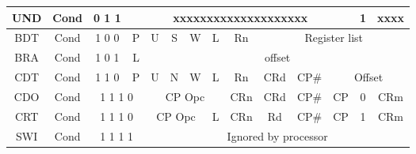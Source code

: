 {{\begin{tabular}{|c|c|c|c|c|c|c|c|c|c|c|c|c|c|c|c|c|c|c|c|c|c|c|c|c|c|c|c|c|c|c|c|c|}
\multicolumn{4}{|c|}{ \textsf{\scriptsize UND}}&
\textsf{\scriptsize Cond}&
\multicolumn{3}{c|}{\textsf{\scriptsize 0 1 1}}&
\multicolumn{20}{c|}{ \textsf{\scriptsize xxxxxxxxxxxxxxxxxxxx}}&
\textsf{\scriptsize 1}&
\multicolumn{4}{c|}{\textsf{\scriptsize xxxx }}\\
\hline 
\multicolumn{4}{|c|}{ \textsf{\scriptsize BDT}}&
\textsf{\scriptsize Cond}&
\multicolumn{3}{c|}{\textsf{\scriptsize 1 0 0}}&
\textsf{\scriptsize P}&
\textsf{\scriptsize U}&
\textsf{\scriptsize S}&
\textsf{\scriptsize W}&
\textsf{\scriptsize L}&
\multicolumn{4}{c|}{\textsf{\scriptsize Rn }}&
\multicolumn{16}{c|}{\textsf{\scriptsize Register list}}\\
\hline 
\multicolumn{4}{|c|}{ \textsf{\scriptsize BRA}}&
\textsf{\scriptsize Cond}&
\multicolumn{3}{c|}{\textsf{\scriptsize 1 0 1}}&
\textsf{\scriptsize L}&
\multicolumn{24}{c|}{\textsf{\scriptsize offset }}\\
\hline 
\multicolumn{4}{|c|}{ \textsf{\scriptsize CDT}}&
\textsf{\scriptsize Cond}&
\multicolumn{3}{c|}{\textsf{\scriptsize 1 1 0}}&
\textsf{\scriptsize P}&
\textsf{\scriptsize U}&
\textsf{\scriptsize N}&
\textsf{\scriptsize W}&
\textsf{\scriptsize L}&
\multicolumn{4}{c|}{\textsf{\scriptsize Rn }}&
\multicolumn{4}{c|}{\textsf{\scriptsize CRd }}&
\multicolumn{4}{c|}{\textsf{\scriptsize CP\# }}&
\multicolumn{8}{c|}{\textsf{\scriptsize Offset }}\\
\hline 
\multicolumn{4}{|c|}{ \textsf{\scriptsize CDO}}&
\textsf{\scriptsize Cond}&
\multicolumn{4}{c|}{\textsf{\scriptsize 1 1 1 0}}&
\multicolumn{4}{c|}{\textsf{\scriptsize CP Opc}}&
\multicolumn{4}{c|}{\textsf{\scriptsize CRn }}&
\multicolumn{4}{c|}{\textsf{\scriptsize CRd }}&
\multicolumn{4}{c|}{\textsf{\scriptsize CP\# }}&
\multicolumn{3}{c|}{\textsf{\scriptsize CP }}&
\textsf{\scriptsize 0}&
\multicolumn{4}{c|}{\textsf{\scriptsize CRm }}\\
\hline 
\multicolumn{4}{|c|}{ \textsf{\scriptsize CRT}}&
\textsf{\scriptsize Cond}&
\multicolumn{4}{c|}{ \textsf{\scriptsize 1 1 1 0}}&
\multicolumn{3}{c|}{\textsf{\scriptsize CP Opc}}&
\textsf{\scriptsize L}&
\multicolumn{4}{c|}{\textsf{\scriptsize CRn }}&
\multicolumn{4}{c|}{\textsf{\scriptsize Rd }}&
\multicolumn{4}{c|}{\textsf{\scriptsize CP\# }}&
\multicolumn{3}{c|}{\textsf{\scriptsize CP }}&
\textsf{\scriptsize 1}&
\multicolumn{4}{c|}{\textsf{\scriptsize CRm }}\\
\hline 
\multicolumn{4}{|c|}{\textsf{\scriptsize SWI}}&
\textsf{\scriptsize Cond}&
\multicolumn{4}{c|}{ \textsf{\scriptsize 1 1 1 1}}&
\multicolumn{24}{c|}{\textsf{\scriptsize Ignored by processor}}\\
\hline 
\end{tabular}\scriptsize \par}
}
